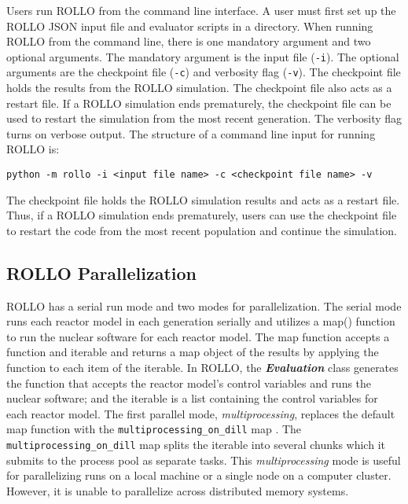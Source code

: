 Users run \gls{ROLLO} from the command line interface. 
A user must first set up the \gls{ROLLO} JSON input file and evaluator 
scripts in a directory. 
When running \gls{ROLLO} from the command line, there is one mandatory argument and 
two optional arguments. 
The mandatory argument is the input file (\texttt{-i}). 
The optional arguments are the checkpoint file (\texttt{-c}) and verbosity 
flag (\texttt{-v}).  
The checkpoint file holds the results from the \gls{ROLLO} simulation. 
The checkpoint file also acts as a restart file. 
If a ROLLO simulation ends prematurely, the checkpoint file can be used to restart 
the simulation from the most recent generation.
The verbosity flag turns on verbose output. 
The structure of a command line input for running \gls{ROLLO} is: 

\noindent
\texttt{python -m rollo -i <input file name> -c <checkpoint file name> -v}

The checkpoint file holds the \gls{ROLLO} simulation results and acts as a restart file.
Thus, if a \gls{ROLLO} simulation ends prematurely, users can use the checkpoint file to 
restart the code from the most recent population and continue the simulation. 

\subsection{ROLLO Parallelization}
\label{sec:rollo_parallel}
\gls{ROLLO} has a serial run mode and two modes for parallelization. 
The serial mode runs each reactor model in each generation serially and utilizes a 
map() function to run the nuclear software for each reactor model.
The map function accepts a function and iterable and returns a map object of the results 
by applying the function to each item of the iterable. 
In \gls{ROLLO}, the \textbf{\textit{Evaluation}} class generates the function 
that accepts the reactor model's control variables and runs the nuclear software;
and the iterable is a list containing the control variables for each reactor model. 
The first parallel mode, \textit{multiprocessing}, replaces the default map function 
with the \texttt{multiprocessing\_on\_dill} map \cite{smallshire_multiprocessing_on_dill_nodate}.
The \texttt{multiprocessing\_on\_dill} map splits the iterable into several chunks 
which it submits to the process pool as separate tasks.
This \textit{multiprocessing} mode is useful for parallelizing runs on a local machine or 
a single node on a computer cluster. 
However, it is unable to parallelize across distributed memory systems.

